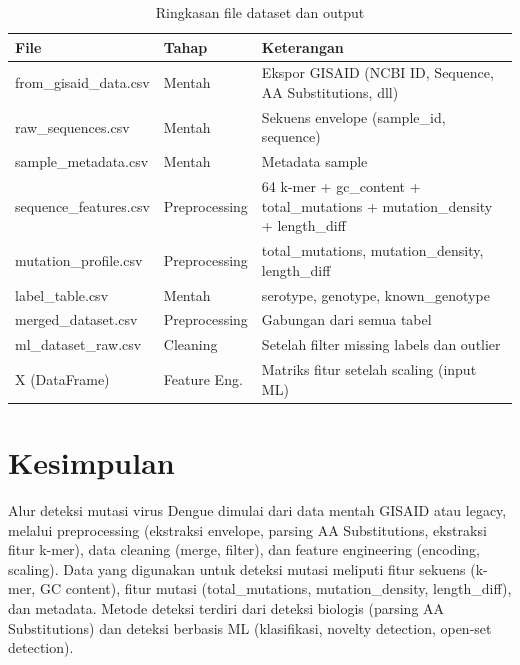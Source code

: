 \documentclass[12pt,a4paper]{article}
\begin{document}
\begin{table}[h]
\centering
\caption{Ringkasan file dataset dan output}
\small
\begin{tabular}{@{}lll@{}}
\toprule
\textbf{File} & \textbf{Tahap} & \textbf{Keterangan} \\
\midrule
from\_gisaid\_data.csv & Mentah & Ekspor GISAID (NCBI ID, Sequence, AA Substitutions, dll) \\
raw\_sequences.csv & Mentah & Sekuens envelope (sample\_id, sequence) \\
sample\_metadata.csv & Mentah & Metadata sample \\
sequence\_features.csv & Preprocessing & 64 k-mer + gc\_content + total\_mutations + mutation\_density + length\_diff \\
mutation\_profile.csv & Preprocessing & total\_mutations, mutation\_density, length\_diff \\
label\_table.csv & Mentah & serotype, genotype, known\_genotype \\
merged\_dataset.csv & Preprocessing & Gabungan dari semua tabel \\
ml\_dataset\_raw.csv & Cleaning & Setelah filter missing labels dan outlier \\
X (DataFrame) & Feature Eng. & Matriks fitur setelah scaling (input ML) \\
\bottomrule
\end{tabular}
\end{table}

\section{Kesimpulan}

Alur deteksi mutasi virus Dengue dimulai dari data mentah GISAID atau legacy, melalui preprocessing (ekstraksi envelope, parsing AA Substitutions, ekstraksi fitur k-mer), data cleaning (merge, filter), dan feature engineering (encoding, scaling). Data yang digunakan untuk deteksi mutasi meliputi fitur sekuens (k-mer, GC content), fitur mutasi (total\_mutations, mutation\_density, length\_diff), dan metadata. Metode deteksi terdiri dari deteksi biologis (parsing AA Substitutions) dan deteksi berbasis ML (klasifikasi, novelty detection, open-set detection).
\end{document}
